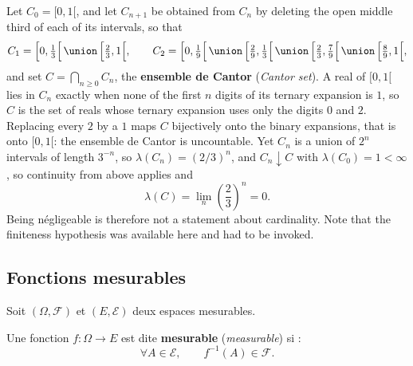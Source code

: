 \begin{example}
  Let $C_{0} = [0,1[$, and let $C_{n+1}$ be obtained from $C_{n}$ by deleting the
  open middle third of each of its intervals, so that
  \[
    C_{1} = \Bigl[0,\tfrac{1}{3}\Bigr[ \,\union\, \Bigl[\tfrac{2}{3},1\Bigr[,
    \qquad
    C_{2} = \Bigl[0,\tfrac{1}{9}\Bigr[ \,\union\, \Bigl[\tfrac{2}{9},\tfrac{1}{3}
    \Bigr[ \,\union\, \Bigl[\tfrac{2}{3},\tfrac{7}{9}\Bigr[ \,\union\,
    \Bigl[\tfrac{8}{9},1\Bigr[,
  \]
  and set $C = \bigcap_{n \geq 0} C_{n}$, the \textbf{ensemble de Cantor}
  (\textit{Cantor set}). A real of $[0,1[$ lies in $C_{n}$ exactly when none of
  the first $n$ digits of its ternary expansion is $1$, so $C$ is the set of reals whose
  ternary expansion uses only the digits $0$ and $2$. Replacing every $2$ by a $1$
  maps $C$ bijectively onto the binary expansions, that is onto $[0,1[$: the
  ensemble de Cantor is uncountable. Yet $C_{n}$ is a union of $2^{n}$ intervals of
  length $3^{-n}$, so $\lambda(C_{n}) = (2/3)^{n}$, and $C_{n} \downarrow C$ with
  $\lambda(C_{0}) = 1 < \infty$, so continuity from above applies and
  \[
    \lambda(C) = \lim_{n} \left(\frac{2}{3}\right)^{n} = 0 .
  \]
  Being négligeable is therefore not a statement about cardinality. Note that the
  finiteness hypothesis was available here and had to be invoked.
\end{example}

\subsection{Fonctions mesurables}

Soit $(\Omega,\mathcal{F})$ et $(E,\mathcal{E})$ deux espaces mesurables.

\begin{definition}
  Une fonction $f : \Omega \to E$ est dite \textbf{mesurable} (\textit{measurable})
  si :
  \[
    \forall A \in \mathcal{E}, \qquad f^{-1}(A) \in \mathcal{F}.
  \]
\end{definition}

\begin{figure}[h!]
  \centering
\end{figure}

